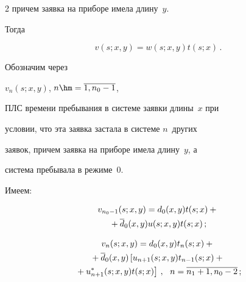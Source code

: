 \begin{multicols}{2}
причем заявка на приборе имела длину~$y$.


Тогда


$$


v(s;x,y)= w(s;x,y) t(s;x)\,.


$$





Обозначим через


$v_{n}(s;x,y)$, $n\hm=\overline{1,n_0-1}$,


ПЛС времени пребывания в системе заявки длины~$x$ при


условии, что эта заявка застала в системе $n$~других


заявок, причем заявка на приборе имела длину~$y$, а


система пребывала в режиме~0.


Имеем:


\begin{multline}


\label{5-5-1-m}


v_{n_0-1}(s;x,y) = d_0(x,y) t(s;x) + {}\\


{}+\d_0(x,y) u(s;x,y) t(s;x)\,;


\end{multline}







\vspace*{-12pt}





\noindent


\begin{multline}


\label{5-5-2-m}


v_{n}(s;x,y) = d_0(x,y) t_{n}(s;x) +{}\\


{}+


\d_0(x,y) \left[ u_{n+1}(s;x,y) t_{n-1}(s;x) +{}\right.\\


\left.{}+ u^*_{n+1}(s;x,y) t(s;x)\right]\,,


\ \ n=\overline{n_1+1,n_0-2}\,;


\end{multline}








\end{multicols}
